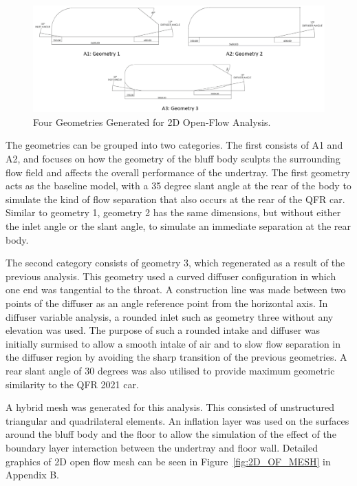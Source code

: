 \begin{figure}[!ht]
    \centering
    \includegraphics[scale = 0.5]{Figures/2D_OF/2D_OF_GEOM.png}
    \caption{Four Geometries Generated for 2D Open-Flow Analysis.}
    \label{fig:2D_OF_GEOM}
\end{figure}

\noindent The geometries can be grouped into two categories. The first consists of A1 and A2, and focuses on how the geometry of the bluff body sculpts the surrounding flow field and affects the overall performance of the undertray. The first geometry acts as the baseline model, with a 35 degree slant angle at the rear of the body to simulate the kind of flow separation that also occurs at the rear of the QFR car. Similar to geometry 1, geometry 2 has the same dimensions, but without either the inlet angle or the slant angle, to simulate an immediate separation at the rear body.

\noindent The second category consists of geometry 3, which regenerated as a result of the previous analysis. This geometry used a curved diffuser configuration in which one end was tangential to the throat. A construction line was made between two points of the diffuser as an angle reference point from the horizontal axis. In diffuser variable analysis, a rounded inlet such as geometry three without any elevation was used. The purpose of such a rounded intake and diffuser was initially surmised to allow a smooth intake of air and to slow flow separation in the diffuser region by avoiding the sharp transition of the previous geometries. A rear slant angle of 30 degrees was also utilised to provide maximum geometric similarity to the QFR 2021 car.

\noindent A hybrid mesh was generated for this analysis. This consisted of unstructured triangular and quadrilateral elements. An inflation layer was used on the surfaces around the bluff body and the floor to allow the simulation of the effect of the boundary layer interaction between the undertray and floor wall. Detailed graphics of 2D open flow mesh can be seen in Figure~\ref{fig:2D_OF_MESH} in Appendix B.

